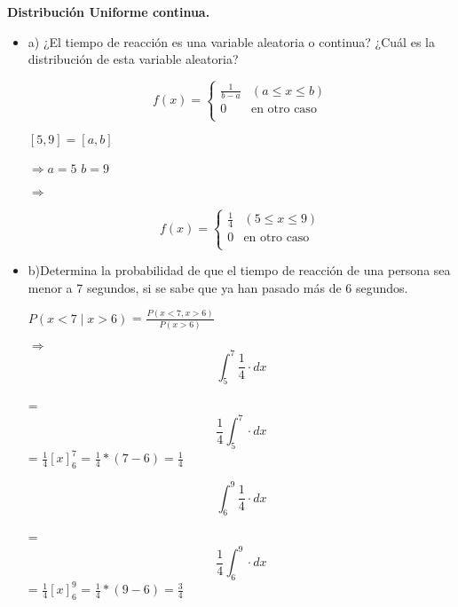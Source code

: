 \documentclass{../oxmathproblems}
\begin{document}
\begin{questions}

\miquestion \textbf {Distribución Uniforme continua.} 
\begin{itemize}
\item  a) ¿El tiempo de reacción es una variable aleatoria o continua? ¿Cuál es la distribución de esta variable aleatoria?


$$$$ 
\[   
f(x) = 
     \begin{cases}
        \frac{1}{b-a} & (a \leq x \leq b)\\
       0 & \text{en otro caso} \\
     \end{cases}
\]
$$$$


$[5,9] = [a,b]$

$\Rightarrow a = 5$  $b = 9$

$\Rightarrow$ 

$$$$ 
\[   
f(x) = 
     \begin{cases}
        \frac{1}{4} & (5 \leq x \leq 9)\\
       0 & \text{en otro caso} \\
     \end{cases}
\]
$$$$


\item  b)Determina la probabilidad de que el tiempo de reacción de una persona sea menor a 7 segundos, si se sabe que ya han pasado más de 6 segundos. 

$ P(x < 7 \mid x > 6) $ 
= 
$ \frac{P(x<7,x>6)}{P(x>6)}$

$\Rightarrow$  
\begin{equation}
 \int _{5}^{7}  \frac{1}{4}  \cdot dx
\end{equation} 

= 
\begin{equation}
 \frac{1}{4} \int _{5}^{7} \cdot dx
\end{equation} 
= 
$ \frac{1}{4}[x]_6^7$  = $\frac{1}{4}*(7-6) = \frac{1}{4} $ 

\begin{equation}
 \int _{6}^{9}  \frac{1}{4}  \cdot dx
\end{equation} 

= 
\begin{equation}
 \frac{1}{4} \int _{6}^{9} \cdot dx
\end{equation} 
= 
$ \frac{1}{4}[x]_6^9$  = $\frac{1}{4}*(9-6) = \frac{3}{4} $ 


\end{itemize}
\end{questions}
\end{document}
